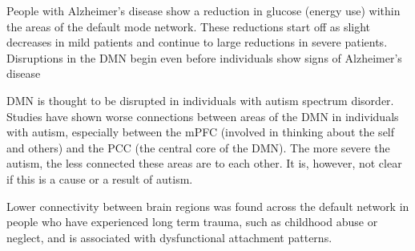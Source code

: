 


People with Alzheimer's disease show a reduction in glucose (energy use) within
the areas of the default mode network. These reductions start off as slight
decreases in mild patients and continue to large reductions in severe patients.
Disruptions in the DMN begin even before individuals show signs of Alzheimer's disease

DMN is thought to be disrupted in individuals with autism spectrum disorder.
Studies have shown worse connections between areas of the DMN in individuals
with autism, especially between the mPFC (involved in thinking about the self
and others) and the PCC (the central core of the DMN). 
The more severe the autism, the less connected these areas are to each other.
It is, however, not clear if this is a cause or a result of autism.



Lower connectivity between brain regions was found across the default network in
people who have experienced long term trauma, such as childhood abuse or
neglect, and is associated with dysfunctional attachment patterns.


